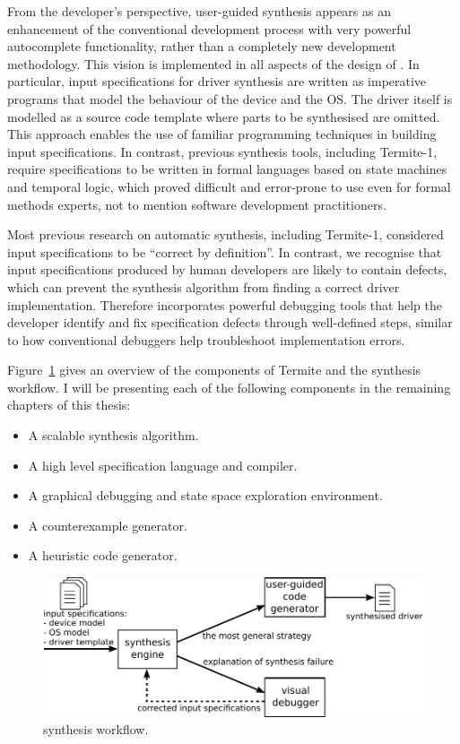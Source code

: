 From the developer's perspective, user-guided synthesis appears as an enhancement of the conventional development process with very powerful autocomplete functionality, rather than a completely new development methodology.  This vision is implemented in all aspects of the design of \termite.  In particular, input specifications for driver synthesis are written as imperative programs that model the behaviour of the device and the OS\@.  The driver itself is modelled as a source code template where parts to be synthesised are omitted.  This approach enables the use of familiar programming techniques in building input specifications.  In contrast, previous synthesis tools, including Termite-1, require specifications to be written in formal languages based on state machines and temporal logic, which proved difficult and error-prone to use even for formal methods experts, not to mention software development practitioners.

Most previous research on automatic synthesis, including Termite-1, considered input specifications to be ``correct by definition''.  In contrast, we recognise that input specifications produced by human developers are likely to contain defects, which can prevent the synthesis algorithm from finding a correct driver implementation.  Therefore \termite incorporates powerful debugging tools that help the developer identify and fix specification defects through well-defined steps, similar to how conventional debuggers help troubleshoot implementation errors.

Figure~\ref{f:termite_intro} gives an overview of the components of Termite and the synthesis workflow. I will be presenting each of the following components in the remaining chapters of this thesis:
\begin{itemize}
    \item A scalable synthesis algorithm.
    \item A high level specification language and compiler.
    \item A graphical debugging and state space exploration environment.
    \item A counterexample generator.
    \item A heuristic code generator.
\end{itemize}

\begin{figure}
    \center
    \includegraphics[width=\linewidth]{imgs/termite.pdf}
    \caption{\termite synthesis workflow.}\label{f:termite_intro}
\end{figure}

